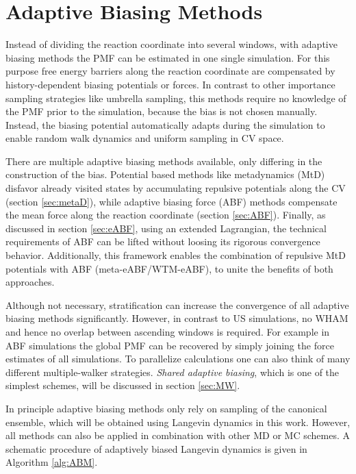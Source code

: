\newpage
\section{Adaptive Biasing Methods}
\label{sec:adaptive biasing}

Instead of dividing the reaction coordinate into several windows, with adaptive biasing methods the PMF can be estimated in one single simulation. For this purpose free energy barriers along the reaction coordinate are compensated by history-dependent biasing potentials or forces. In contrast to other importance sampling strategies like umbrella sampling, this methods require no knowledge of the PMF prior to the simulation, because the bias is not chosen manually. Instead, the biasing potential automatically adapts during the simulation to enable random walk dynamics and uniform sampling in CV space.\autocite{comer2015adaptive, barducci2011metadynamics}

There are multiple adaptive biasing methods available, only differing in the construction of the bias. Potential based methods like metadynamics (MtD) disfavor already visited states by accumulating repulsive potentials along the CV (section \ref{sec:metaD}), while adaptive biasing force (ABF) methods compensate the mean force along the reaction coordinate (section \ref{sec:ABF}). Finally, as discussed in section \ref{sec:eABF}, using an extended Lagrangian, the technical requirements of ABF can be lifted without loosing its rigorous convergence behavior.\autocite{lesage2017smoothed} Additionally, this framework enables the combination of repulsive MtD potentials with ABF (meta-eABF/WTM-eABF), to unite the benefits of both approaches.\autocite{fu2018zooming,fu2019taming}

Although not necessary, stratification can increase the convergence of all adaptive biasing methods significantly. However, in contrast to US simulations, no WHAM and hence no overlap between ascending windows is required. For example in ABF simulations the global PMF can be recovered by simply joining the force estimates of all simulations.\autocite{comer2015adaptive}
To parallelize calculations one can also think of many different multiple-walker strategies.\autocite{wilson2011molecular,comer2014calculation,minoukadeh2010potential}
\textit{Shared adaptive biasing}, which is one of the simplest schemes, will be discussed in section \ref{sec:MW}.

In principle adaptive biasing methods only rely on sampling of the canonical ensemble, which will be obtained using Langevin dynamics in this work. However, all methods can also be applied in combination with other MD or MC schemes. A schematic procedure of adaptively biased Langevin dynamics is given in Algorithm \ref{alg:ABM}.

